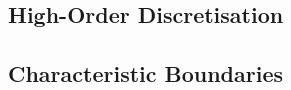 
\subsection{High-Order Discretisation}




\subsection{Characteristic Boundaries}

\cite{thompson1987TimeDependentBoundary, thompson1990TimeDependentBoundaryConditions, poinsot1992BoundaryConditionsDirect, poinsot2005TheoreticalNumericalCombustion, sutherland2003ImprovedBoundaryConditions}













